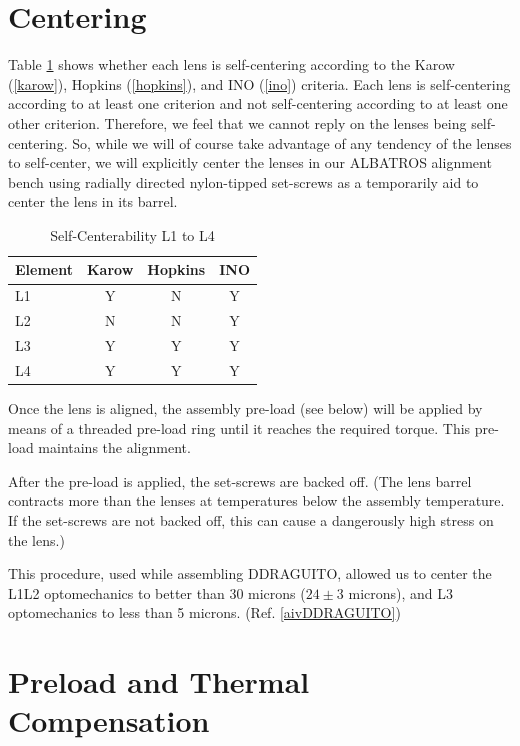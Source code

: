 \documentclass{report}
\begin{document}
\section{Centering}

Table \ref{table:self-centerability} shows whether each lens is self-centering according to the Karow (\ref{karow}), Hopkins (\ref{hopkins}), and INO (\ref{ino}) criteria. Each lens is self-centering according to at least one criterion and not self-centering according to at least one other criterion.
Therefore, we feel that we cannot reply on the lenses being self-centering.
So, while we will of course take advantage of any tendency of the lenses to self-center, we will explicitly center the lenses in our ALBATROS alignment bench using radially directed nylon-tipped set-screws as a temporarily aid to center the lens in its barrel. 

\begin{table}
\caption{Self-Centerability L1 to L4}
\label{table:self-centerability}
\begin{center}
\small
\begin{tabular}{lccc}
\hline
\hline
Element&Karow&Hopkins&INO\\
\hline
L1&Y&N&Y\\
L2&N&N&Y\\
L3&Y&Y&Y\\
L4&Y&Y&Y\\
\hline
\end{tabular}
\end{center}
\end{table}

Once the lens is aligned, the assembly pre-load (see below) will be applied by means of a threaded pre-load ring until it reaches the required torque. This pre-load maintains the alignment.

After the pre-load is applied, the set-screws are backed off. (The lens barrel contracts more than the lenses at temperatures below the assembly temperature. If the set-screws are not backed off, this can cause a dangerously high stress on the lens.)

This procedure, used while assembling DDRAGUITO, allowed us to center the L1L2 optomechanics to better than 30 microns ($24 \pm 3$ microns), and L3 optomechanics to less than 5 microns. (Ref. \ref{aivDDRAGUITO})


\section{Preload and Thermal Compensation}
\end{document}
